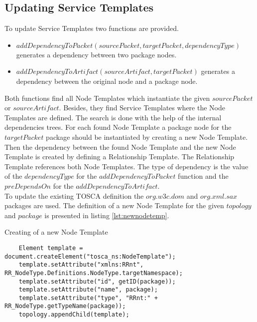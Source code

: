 \subsection*{Updating Service Templates}
To update Service Templates two functions are provided.
\begin{itemize}
	\item $addDependencyToPacket(sourcePacket, targetPacket, dependencyType)$ generates a dependency between two package nodes.
	\item $addDependencyToArtifact(sourceArtifact, targetPacket)$ generates a dependency between the original node and a package node.
\end{itemize} 
Both functions find all Node Templates which instantiate the given $sourcePacket$ or $sourceArtifact$.
Besides, they find Service Templates where the Node Templates are defined.
The search is done with the help of the internal dependencies trees.
For each found Node Template a package node for the $targetPacket$ package should be instantiated by creating a new Node Template.
Then the dependency between the found Node Template and the new Node Template is created by defining a Relationship Template.
The Relationship Template references both Node Templates. 
The type of dependency is the value of the $dependencyType$ for the $addDependencyToPacket$ function and the $preDependsOn$ for the $addDependencyToArtifact$.\\
To update the existing TOSCA definition the $org$.$w3c$.$dom$ and $org$.$xml$.$sax$ packages are used. 
The definition of a new Node Template for the given $topology$ and $package$ is presented in listing \ref{lst:newnodetemp}.
\begin{Listing}
	\caption{Creating of a new Node Template}
	\label{lst:newnodetemp}
	\begin{lstlisting}  
	Element template = document.createElement("tosca_ns:NodeTemplate");
	template.setAttribute("xmlns:RRnt", RR_NodeType.Definitions.NodeType.targetNamespace);
	template.setAttribute("id", getID(package));
	template.setAttribute("name", package);
	template.setAttribute("type", "RRnt:" + RR_NodeType.getTypeName(package));
	topology.appendChild(template);
	\end{lstlisting}
\end{Listing}
